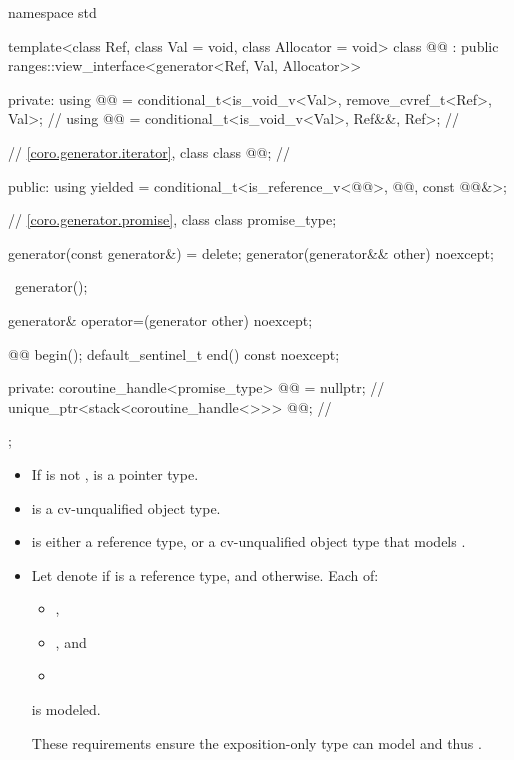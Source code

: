 \begin{codeblock}
namespace std {
  template<class Ref, class Val = void, class Allocator = void>
  class @@ : public ranges::view_interface<generator<Ref, Val, Allocator>> {
  private:
    using @@ = conditional_t<is_void_v<Val>, remove_cvref_t<Ref>, Val>;  // \expos
    using @@ = conditional_t<is_void_v<Val>, Ref&&, Ref>;          // \expos

    // \ref{coro.generator.iterator}, class 
    class @@;                                                     // \expos

  public:
    using yielded =
      conditional_t<is_reference_v<@@>, @@, const @@&>;

    // \ref{coro.generator.promise}, class 
    class promise_type;

    generator(const generator&) = delete;
    generator(generator&& other) noexcept;

    ~generator();

    generator& operator=(generator other) noexcept;

    @@ begin();
    default_sentinel_t end() const noexcept;

  private:
    coroutine_handle<promise_type> @@ = nullptr;  // \expos
    unique_ptr<stack<coroutine_handle<>>> @@;        // \expos
  };
}
\end{codeblock}

\pnum
\mandates
\begin{itemize}
\item
If  is not ,
 is a pointer type.
\item
{} is a cv-unqualified object type.
\item
{} is either a reference type, or
a cv-unqualified object type that models .
\item
Let  denote 
if  is a reference type,
and  otherwise.
Each of:
\begin{itemize}
\item {},
\item {}, and
\item {}
\end{itemize}
is modeled.
\begin{note}
These requirements ensure the exposition-only  type
can model  and thus .
\end{note}
\end{itemize}

